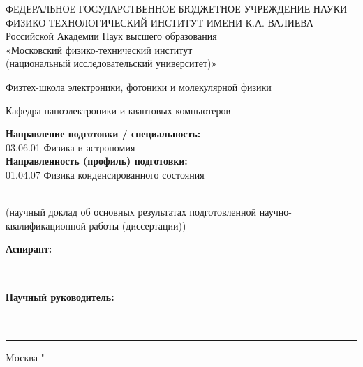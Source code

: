 \newcommand{\sfs}{\fontsize{14pt}{15pt}\selectfont}
\thispagestyle{empty}


\begin{center}
ФЕДЕРАЛЬНОЕ ГОСУДАРСТВЕННОЕ БЮДЖЕТНОЕ УЧРЕЖДЕНИЕ НАУКИ \\
ФИЗИКО-ТЕХНОЛОГИЧЕСКИЙ ИНСТИТУТ ИМЕНИ К.А. ВАЛИЕВА \\
Российской Академии Наук
высшего образования\\ «Московский физико-технический институт\\ (национальный исследовательский университет)»
\end{center}
\begin{center}
Физтех-школа электроники, фотоники и молекулярной физики
\end{center}
\begin{center}
Кафедра наноэлектроники и квантовых компьютеров
\end{center}
\begin{flushleft}
\textbf{Направление подготовки / специальность:}\\
03.06.01 Физика и астрономия\\
\textbf{Направленность (профиль) подготовки:}\\
01.04.07 Физика конденсированного состояния
\end{flushleft}
\vspace{0pt plus4cm}
\begin{center}
\textbf{\Large \thesisTitle}\\[1cm]
(научный доклад об основных результатах подготовленной 
научно-квалификационной работы (диссертации))
\end{center}
\vspace{0pt plus4cm}
\begin{flushright}
\begin{minipage}{0.5\textwidth}
\textbf{Аспирант:}\\
\thesisAuthor\\
\vspace{0.5cm}
\hrule
\vspace{1cm}
\textbf{Научный руководитель:}\\
\supervisorRegalia\\
\supervisorFio\\
\vspace{0.5cm}
\hrule
\end{minipage}
\end{flushright}
\vspace*{\fill}
\begin{center}
{\large{Mосква "--- \thesisYear}}
\end{center}